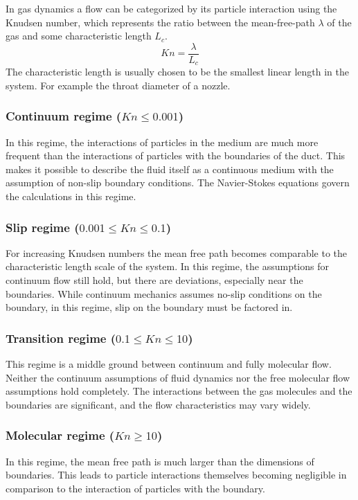 	In gas dynamics a flow can be categorized by its particle interaction using the Knudsen number, which represents the ratio between the mean-free-path $\lambda$ of the gas and some characteristic length $L_c$.
	$$
		Kn=\frac{\lambda}{L_c}
	$$
	The characteristic length is usually chosen to be the smallest linear length in the system.
	For example the throat diameter of a nozzle. \cite{putignano2012supersonic}
\subsubsection{Continuum regime (\(Kn \leq 0.001\))}
	
	In this regime, the interactions of particles in the medium are much more frequent than the interactions of particles with the boundaries of the duct.
	This makes it possible to describe the fluid itself as a continuous medium with the assumption of non-slip boundary conditions.
	The Navier-Stokes equations govern the calculations in this regime.
	

\subsubsection{Slip regime (\(0.001 \leq Kn \leq 0.1\))}

	For increasing Knudsen numbers the mean free path becomes comparable to the characteristic length scale of the system.
	In this regime, the assumptions for continuum flow still hold, but there are deviations, especially near the boundaries.
	While continuum mechanics assumes no-slip conditions on the boundary, in this regime, slip on the boundary must be factored in.

	

\subsubsection{Transition regime (\(0.1 \leq Kn \leq 10\))}
	
	This regime is a middle ground between continuum and fully molecular flow.
	Neither the continuum assumptions of fluid dynamics nor the free molecular flow assumptions hold completely.
	The interactions between the gas molecules and the boundaries are significant, and the flow characteristics may vary widely.

\subsubsection{Molecular regime (\(Kn \geq 10\))}

	In this regime, the mean free path is much larger than the dimensions of boundaries.
	This leads to particle interactions themselves becoming negligible in comparison to the interaction of particles with the boundary.
	\cite{rapp2017microfluidics}
	
